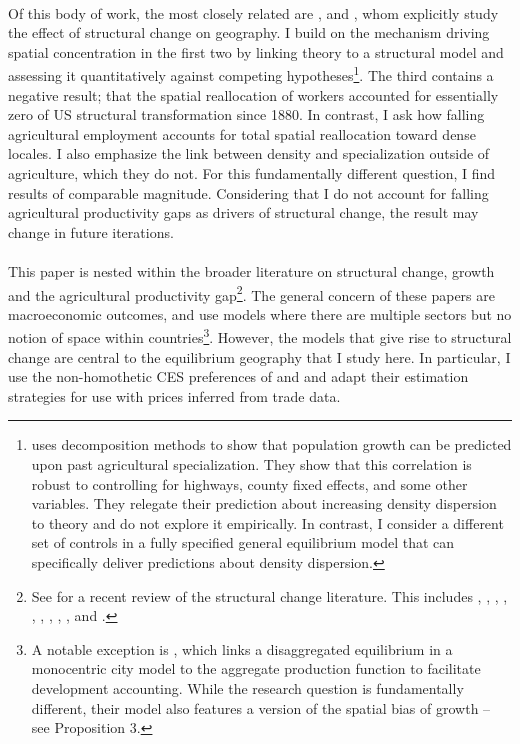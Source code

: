 \documentclass[]{article}
\theoremstyle{plain}
\begin{document}
\paragraph*{}
Of this body of work, the most closely related are \citet{urbstruct}, \citet{MURATA2008} and \citet{eckertpeters}, whom explicitly study the effect of structural change on geography. I build on the mechanism driving spatial concentration in the first two by linking theory to a structural model and assessing it quantitatively against competing hypotheses\footnote{\citet{urbstruct} uses decomposition methods to show that population growth can be predicted upon past agricultural specialization. They show that this correlation is robust to controlling for highways, county fixed effects, and some other variables. They relegate their prediction about increasing density dispersion to theory and do not explore it empirically. In contrast, I consider a different set of controls in a fully specified general equilibrium model that can specifically deliver predictions about density dispersion.}. The third contains a negative result; that the spatial reallocation of workers accounted for essentially zero of US structural transformation since 1880. In contrast, I ask how falling agricultural employment accounts for total spatial reallocation toward dense locales. I also emphasize the link between density and specialization outside of agriculture, which they do not. For this fundamentally different question, I find results of comparable magnitude. Considering that I do not account for falling agricultural productivity gaps as drivers of structural change, the result may change in future iterations.
\paragraph*{}
This paper is nested within the broader literature on structural change, growth and the agricultural productivity gap\footnote{See \citet{hrvch6} for a recent review of the structural change literature. This includes \citet{ngaipissa}, \citet{boppart2014}, \citet{cominetal2021}, \citet{matsuyama1992, matsuyama2009, engelslawglobal}, \citet{uy2013}, \citet{bustos1996etal}, \citet{bustos2020etal}, \citet{swiecki2017}, \citet{loganetal}, \citet{cravinosotelo}  and \citet{duarterestuccia}.}. The general concern of these papers are macroeconomic outcomes, and use models where there are multiple sectors but no notion of space within countries\footnote{A notable exception is \citet{karadi2017cattle}, which links a disaggregated equilibrium in a monocentric city model to the aggregate production function to facilitate development accounting. While the research question is fundamentally different, their model also features a version of the spatial bias of growth -- see Proposition 3.}. However, the models that give rise to structural change are central to the equilibrium geography that I study here. In particular, I use the non-homothetic CES preferences of \citet{cominetal2021} and \citet{loganetal} and adapt their estimation strategies for use with prices inferred from trade data. 
\end{document}
